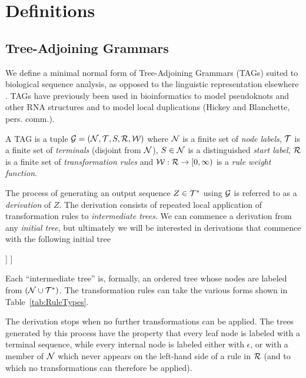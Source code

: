 \documentclass[10pt]{article}
\newcommand{\tabnum}[1]{\ref{tab:#1}}
\newcommand{\tabref}[1]{Table~\tabnum{#1}}
\begin{document}
\section{Definitions}

\subsection{Tree-Adjoining Grammars}

We define a minimal normal form of Tree-Adjoining Grammars (TAGs)
suited to biological sequence analysis,
as opposed to the linguistic representation elsewhere \cite{JoshiSchabes97}.
TAGs have previously been used in bioinformatics
to model pseudoknots and other RNA structures \cite{MatsuiEtAl2005,ChiangJoshiSearls2006}
and to model local duplications (Hickey and Blanchette, pers. comm.).

\newcommand\grammar{{\cal G}}
\newcommand\nodelabels{{\cal N}}
\newcommand\terminals{{\cal T}}
\newcommand\startsymbol{S}
\newcommand\rules{{\cal R}}
\newcommand\weight{{\cal W}}

A TAG is a tuple $\grammar=(\nodelabels,\terminals,\startsymbol,\rules,\weight)$ where
$\nodelabels$ is a finite set of {\em node labels},
$\terminals$ is a finite set of {\em terminals} (disjoint from $\nodelabels$),
$\startsymbol \in \nodelabels$ is a distinguished {\em start label},
$\rules$ is a finite set of {\em transformation rules}
and $\weight:\rules \to [0,\infty)$ is a {\em rule weight function}.

\newcommand\outseq{Z}
\newcommand\outsubseq[2]{\outseq[#1 \ldots #2]}

The process of generating an output sequence $\outseq \in \terminals^\ast$ using $\grammar$
is referred to as a {\em derivation} of $\outseq$.
The derivation consists of repeated local application of transformation rules to {\em intermediate trees}.
We can commence a derivation from any {\em initial tree}, but ultimately we will be interested in derivations that commence with the following initial tree

\Tree[ .$\epsilon$ [ .$\startsymbol$ [ .$\epsilon$ ] ] ]

\newcommand\rulesubset[2]{\rules_{#1}(#2)}

Each ``intermediate tree'' is, formally, an ordered tree whose nodes are labeled from
$(\nodelabels \cup \terminals^\ast)$.
The transformation rules can take the various forms shown in \tabref{RuleTypes}.

The derivation stops when no further transformations can be applied.
The trees generated by this process have the property that every leaf node is labeled with a terminal sequence,
while every internal node is labeled either with $\epsilon$, or with a member of $\nodelabels$
which never appears on the left-hand side of a rule in $\rules$
(and to which no transformations can therefore be applied).
\end{document}
